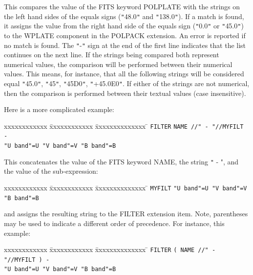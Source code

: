 \documentclass[twoside,11pt]{article}
\renewcommand{\_}{\texttt{\symbol{95}}}
\begin{document}
{{      This compares the value of the FITS keyword POLPLATE with the strings 
      on the left hand sides of the equals signs ({\tt "}48.0{\tt "} and 
      {\tt "}138.0{\tt "}). If a match is found, it assigns the value from 
      the right hand side of the equals sign ({\tt "}0.0{\tt "} or 
      {\tt "}45.0{\tt "}) to the WPLATE component in the POLPACK extension. 
      An error is reported if no match is found. The {\tt "}-{\tt "}
      sign at the end of the first line indicates that the list continues
      on the next line. If the strings being compared both represent 
      numerical values, the comparison will be performed between their
      numerical values. This means, for instance, that all the following 
      strings will be considered equal {\tt "}45.0{\tt "}, {\tt "}45{\tt "}, 
      {\tt "}45D0{\tt "}, {\tt "}+45.0E0{\tt "}. If either of the strings
      are not numerical, then the comparison is performed between their
      textual values (case insensitive).

      Here is a more complicated example:
 
\begin{tabbing}
 xxxxxxxxxxxx \= xxxxxxxxxxxx            \= xxxxxxxxxxxxxx \= \kill
              \>  \texttt{FILTER}        \> \texttt{NAME //" - "//MYFILT -} \\
              \>                         \> \= \texttt{"U band"=U "V band"=V "B band"=B}
\end{tabbing}
 
      This concatenates the value of the FITS keyword NAME, the string
      {\texttt " -  "}, and the value of the sub-expression:
 
\begin{tabbing}
 xxxxxxxxxxxx \= xxxxxxxxxxxx            \= xxxxxxxxxxxxxx \= \kill
              \>  \texttt{MYFILT}        \> \texttt{"U band"=U "V band"=V "B band"=B}
\end{tabbing}
 
      and assigns the resulting string to the FILTER extension item.
      Note, parentheses may be used to indicate a different order of
      precedence. For instance, this example:
 
\begin{tabbing}
 xxxxxxxxxxxx \= xxxxxxxxxxxx            \= xxxxxxxxxxxxxx \= \kill
              \>  \texttt{FILTER}        \> \texttt{( NAME //" - "//MYFILT ) -} \\
              \>                         \> \= \texttt{"U band"=U "V band"=V "B band"=B}
\end{tabbing}
 
}}
\end{document}
